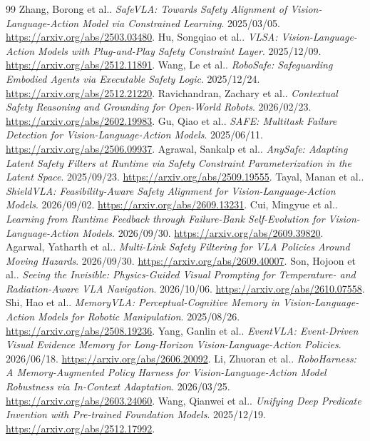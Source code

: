 \begin{thebibliography}{99}
 Zhang, Borong et al.. \emph{SafeVLA: Towards Safety Alignment of Vision-Language-Action Model via Constrained Learning}. 2025/03/05.  \url{https://arxiv.org/abs/2503.03480}.
 Hu, Songqiao et al.. \emph{VLSA: Vision-Language-Action Models with Plug-and-Play Safety Constraint Layer}. 2025/12/09.  \url{https://arxiv.org/abs/2512.11891}.
 Wang, Le et al.. \emph{RoboSafe: Safeguarding Embodied Agents via Executable Safety Logic}. 2025/12/24.  \url{https://arxiv.org/abs/2512.21220}.
 Ravichandran, Zachary et al.. \emph{Contextual Safety Reasoning and Grounding for Open-World Robots}. 2026/02/23.  \url{https://arxiv.org/abs/2602.19983}.
 Gu, Qiao et al.. \emph{SAFE: Multitask Failure Detection for Vision-Language-Action Models}. 2025/06/11.  \url{https://arxiv.org/abs/2506.09937}.
 Agrawal, Sankalp et al.. \emph{AnySafe: Adapting Latent Safety Filters at Runtime via Safety Constraint Parameterization in the Latent Space}. 2025/09/23.  \url{https://arxiv.org/abs/2509.19555}.
 Tayal, Manan et al.. \emph{ShieldVLA: Feasibility-Aware Safety Alignment for Vision-Language-Action Models}. 2026/09/02.  \url{https://arxiv.org/abs/2609.13231}.
 Cui, Mingyue et al.. \emph{Learning from Runtime Feedback through Failure-Bank Self-Evolution for Vision-Language-Action Models}. 2026/09/30.  \url{https://arxiv.org/abs/2609.39820}.
 Agarwal, Yatharth et al.. \emph{Multi-Link Safety Filtering for VLA Policies Around Moving Hazards}. 2026/09/30.  \url{https://arxiv.org/abs/2609.40007}.
 Son, Hojoon et al.. \emph{Seeing the Invisible: Physics-Guided Visual Prompting for Temperature- and Radiation-Aware VLA Navigation}. 2026/10/06.  \url{https://arxiv.org/abs/2610.07558}.
 Shi, Hao et al.. \emph{MemoryVLA: Perceptual-Cognitive Memory in Vision-Language-Action Models for Robotic Manipulation}. 2025/08/26.  \url{https://arxiv.org/abs/2508.19236}.
 Yang, Ganlin et al.. \emph{EventVLA: Event-Driven Visual Evidence Memory for Long-Horizon Vision-Language-Action Policies}. 2026/06/18.  \url{https://arxiv.org/abs/2606.20092}.
 Li, Zhuoran et al.. \emph{RoboHarness: A Memory-Augmented Policy Harness for Vision-Language-Action Model Robustness via In-Context Adaptation}. 2026/03/25.  \url{https://arxiv.org/abs/2603.24060}.
 Wang, Qianwei et al.. \emph{Unifying Deep Predicate Invention with Pre-trained Foundation Models}. 2025/12/19.  \url{https://arxiv.org/abs/2512.17992}.

\end{thebibliography}
